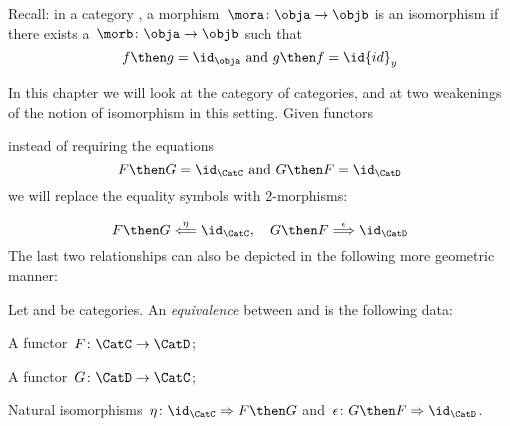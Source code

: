 Recall: in a category \CatC, a morphism~$\mora \colon \obja \to \objb$ is an isomorphism if there exists a~$\morb \colon \obja \rightarrow \objb$ such that
\begin{equation*}
  f \then g = \id_\obja \text{ and } g \then f = \id{id}_y
\end{equation*}

In this chapter we will look at the category \Category of categories, and at two weakenings of the notion of isomorphism in this setting.
Given functors
\begin{center}
\end{center}
instead of requiring the equations
\begin{equation*}
  F \then G = \id_\CatC  \text{ and } G \then F = \id_\CatD
\end{equation*}
we will replace the equality symbols with 2-morphisms:

\begin{equation*}
  F \then G \overset{\eta}{\Longleftarrow} \id_\CatC, \quad  G \then F \overset{\epsilon}{\Longrightarrow} \id_\CatD
\end{equation*}
The last two relationships can also be depicted in the following more geometric manner:
\begin{center}
  \hspace{1cm}
\end{center}

\begin{ctdefinition}
  \label{def:cat-equivalence}
  Let \CatC and \CatD be categories. An \emph{equivalence} between \CatC and \CatD is the following data:
  \begin{compactenum}
    \item A functor~$F\colon  \CatC \to \CatD$;
    \item A functor~$G\colon \CatD \to \CatC$;
    \item Natural isomorphisms~$\eta \colon \id_\CatC \Rightarrow F \then G$ and~$\epsilon\colon  G \then F \Rightarrow \id_\CatD$.
  \end{compactenum}
\end{ctdefinition}


